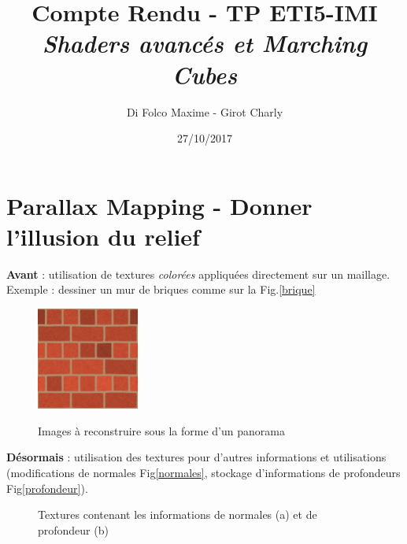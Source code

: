 \documentclass[a4paper]{article}
\title{Compte Rendu - TP ETI5-IMI \\ \textit{Shaders avancés et Marching Cubes}}
\author{Di Folco Maxime - Girot Charly}
\date{27/10/2017}
\begin{document}
\maketitle

\section{Parallax Mapping - Donner l'illusion du relief}

\textbf{Avant} : utilisation de textures \textit{colorées} appliquées directement sur un maillage. Exemple : dessiner un mur de briques comme sur la Fig.\ref{brique}

\begin{figure}[H]
\centering
\includegraphics[width=0.3\textwidth]{figures/brick_diffuse.png}\label{briques}
\caption{Images à reconstruire sous la forme d'un panorama}
\end{figure}


\textbf{Désormais} : utilisation des textures pour d'autres informations et utilisations (modifications de normales Fig\ref{normales}, stockage d'informations de profondeurs Fig\ref{profondeur}). 

\begin{figure}[H]
\centering
{}
\caption{Textures contenant les informations de normales (a) et de profondeur (b)}
\end{figure}







\end{document}
